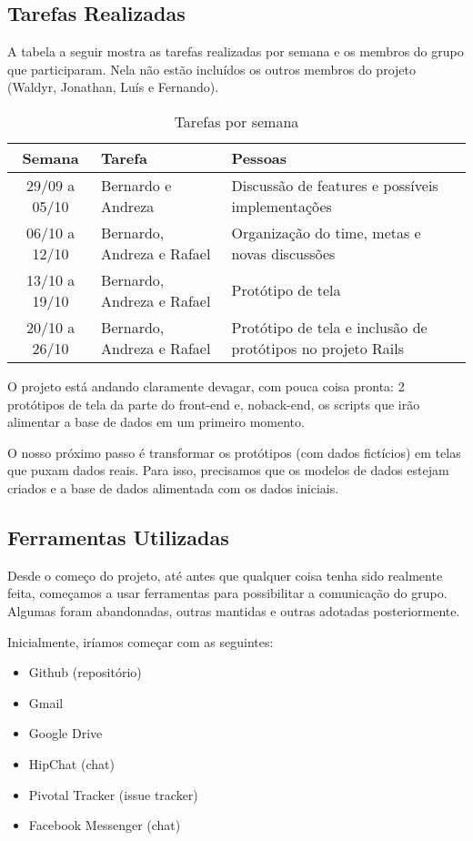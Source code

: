 \documentclass{acm_proc_article-sp}
\begin{document}
\subsection{Tarefas Realizadas}
A tabela a seguir mostra as tarefas realizadas por semana e os membros do grupo que participaram.
Nela não estão incluídos os outros membros do projeto (Waldyr, Jonathan, Luís e Fernando).

\begin{table}[h]
  \caption{Tarefas por semana}
  \begin{tabular}{|cp{3cm}p{3cm}|}
    \hline
    Semana&Tarefa&Pessoas\\
    \hline
    29/09 a 05/10&Bernardo e Andreza&Discussão de features e possíveis implementações\\
    06/10 a 12/10&Bernardo, Andreza e Rafael&Organização do time, metas e novas discussões\\
    13/10 a 19/10&Bernardo, Andreza e Rafael&Protótipo de tela\\
    20/10 a 26/10&Bernardo, Andreza e Rafael&Protótipo de tela e inclusão de protótipos no projeto Rails\\
    \hline
  \end{tabular}
\end{table}

O projeto está andando claramente devagar, com pouca coisa pronta: 2 protótipos de tela da parte do front-end e,
noback-end, os scripts que irão alimentar a base de dados em um primeiro momento.

O nosso próximo passo é transformar os protótipos (com dados fictícios) em telas que puxam dados reais.
Para isso, precisamos que os modelos de dados estejam criados e a base de dados alimentada com os dados iniciais.

\subsection{Ferramentas Utilizadas}

Desde o começo do projeto, até antes que qualquer coisa tenha sido realmente feita, começamos a usar ferramentas para possibilitar
a comunicação do grupo. Algumas foram abandonadas, outras mantidas e outras adotadas posteriormente.

Inicialmente, iríamos começar com as seguintes:

\begin{itemize}
  \item Github (repositório)
  \item Gmail
  \item Google Drive
  \item HipChat (chat)
  \item Pivotal Tracker (issue tracker)
  \item Facebook Messenger (chat)
\end{itemize}
\end{document}
